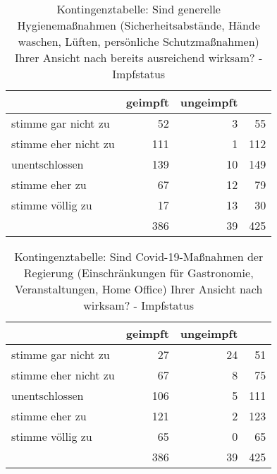 
\clearpage

\begin{table}[ht!]
    \centering
    \begin{tabular} {l | r r | r}
        & geimpft & ungeimpft & \\
        \hline
        stimme gar nicht zu & 52 & 3 & 55 \\
        stimme eher nicht zu & 111 & 1 & 112 \\
        unentschlossen & 139 & 10 & 149 \\
        stimme eher zu & 67 & 12 & 79 \\
        stimme völlig zu & 17 & 13 & 30 \\
        \hline
        & 386 & 39 & 425 \\
    \end{tabular}
    \caption{Kontingenztabelle: Sind generelle Hygienemaßnahmen (Sicherheitsabstände, Hände waschen, Lüften, persönliche Schutzmaßnahmen) Ihrer Ansicht nach bereits ausreichend wirksam? - Impfstatus}
    \label{tab:chi_hygiene_impfstatus}
\end{table}

\begin{table}[ht!]
    \centering
    \begin{tabular} {l | r r | r}
        & geimpft & ungeimpft & \\
        \hline
        stimme gar nicht zu & 27 & 24 & 51 \\
        stimme eher nicht zu & 67 & 8 & 75 \\
        unentschlossen & 106 & 5 & 111 \\
        stimme eher zu & 121 & 2 & 123 \\
        stimme völlig zu & 65 & 0 & 65 \\
        \hline
        & 386 & 39 & 425 \\
    \end{tabular}
    \caption{Kontingenztabelle: Sind Covid-19-Maßnahmen der Regierung (Einschränkungen für Gastronomie, Veranstaltungen, Home Office) Ihrer Ansicht nach wirksam? - Impfstatus}
    \label{tab:chi_hygiene_massnahmen}
\end{table}

\clearpage

